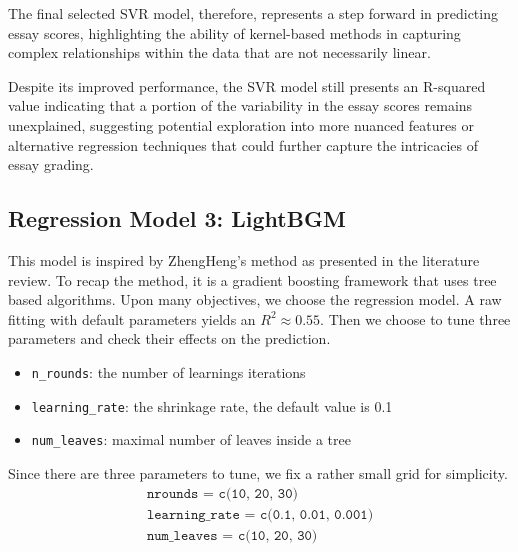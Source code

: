 \documentclass[8pt]{report}
\begin{document}
The final selected SVR model, therefore, represents a step forward in predicting essay scores, highlighting the ability of kernel-based methods in capturing complex relationships within the data that are not necessarily linear.

Despite its improved performance, the SVR model still presents an R-squared value indicating that a portion of the variability in the essay scores remains unexplained, suggesting potential exploration into more nuanced features or alternative regression techniques that could further capture the intricacies of essay grading.

\subsection{Regression Model 3: LightBGM}
This model is inspired by ZhengHeng's method as presented in the literature review.
To recap the method, it is a gradient boosting framework that uses tree based algorithms. 
Upon many objectives, we choose the regression model. 
A raw fitting with default parameters yields an $R^2 \approx 0.55$. 
Then we choose to tune three parameters and check their effects on the prediction.
\begin{itemize}
    \item \texttt{n\_rounds}: the number of learnings iterations
    \item \texttt{learning\_rate}: the shrinkage rate, the default value is 0.1
    \item \texttt{num\_leaves}: maximal number of leaves inside a tree 
\end{itemize}
Since there are three parameters to tune, we fix a rather small grid for simplicity. 
\begin{align*}
    \texttt{nrounds = c(10, 20, 30)} \\
    \texttt{learning\_rate = c(0.1, 0.01, 0.001)} \\
    \texttt{num\_leaves = c(10, 20, 30)}
\end{align*}
\end{document}
